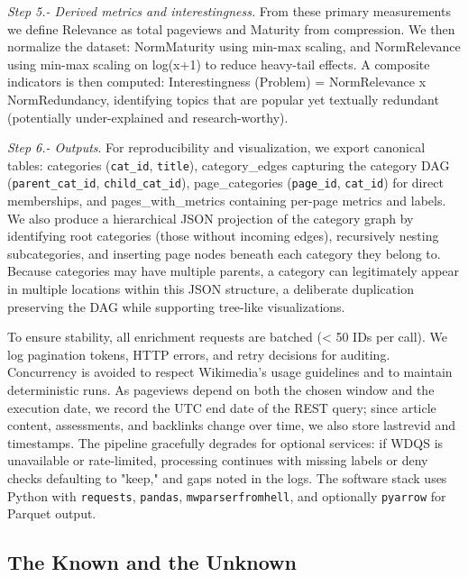 \emph{Step 5.- Derived metrics and interestingness.} From these primary measurements we define Relevance as total pageviews and Maturity from compression. We then normalize the dataset: NormMaturity using min-max scaling, and NormRelevance using min-max scaling on log(x+1) to reduce heavy-tail effects. A composite indicators is then computed: Interestingness (Problem) = NormRelevance x NormRedundancy, identifying topics that are popular yet textually redundant (potentially under-explained and research-worthy).

\emph{Step 6.- Outputs}. For reproducibility and visualization, we export canonical tables: categories (\texttt{cat\_id}, \texttt{title}), category\_edges capturing the category DAG (\texttt{parent\_cat\_id}, \texttt{child\_cat\_id}), page\_categories (\texttt{page\_id}, \texttt{cat\_id}) for direct memberships, and pages\_with\_metrics containing per-page metrics and labels. We also produce a hierarchical JSON projection of the category graph by identifying root categories (those without incoming edges), recursively nesting subcategories, and inserting page nodes beneath each category they belong to. Because categories may have multiple parents, a category can legitimately appear in multiple locations within this JSON structure, a deliberate duplication preserving the DAG while supporting tree-like visualizations.

To ensure stability, all enrichment requests are batched (< 50 IDs per call). We log pagination tokens, HTTP errors, and retry decisions for auditing. Concurrency is avoided to respect Wikimedia's usage guidelines and to maintain deterministic runs. As pageviews depend on both the chosen window and the execution date, we record the UTC end date of the REST query; since article content, assessments, and backlinks change over time, we also store lastrevid and timestamps. The pipeline gracefully degrades for optional services: if WDQS is unavailable or rate-limited, processing continues with missing labels or deny checks defaulting to "keep," and gaps noted in the logs. The software stack uses Python with \texttt{requests}, \texttt{pandas}, \texttt{mwparserfromhell}, and optionally \texttt{pyarrow} for Parquet output.

\subsection*{The Known and the Unknown}

